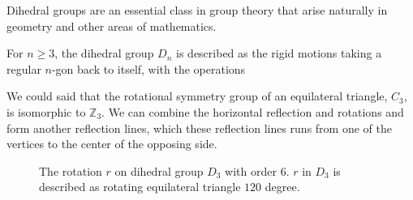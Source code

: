 Dihedral groups are an essential class in group theory that arise naturally in geometry and other areas of mathematics.

For $n \geq 3$, the dihedral group $D_n$ is described as the rigid motions taking a regular 
$n$-gon back to itself, with the operations 

We could said that the rotational symmetry group of an equilateral triangle, $C_3$, is isomorphic to
$\mathbb{Z}_3$. We can combine the horizontal reflection and rotations and form another reflection lines, 
which these reflection lines runs from one of the vertices to the center of the opposing side.

\begin{figure}[ht]
    \centering
\end{figure}
\begin{figure}[ht]
    \centering
\end{figure}
\begin{figure}[ht]
    \centering
    \caption{The rotation $r$ on dihedral group $D_3$ with order 6. $r$ in $D_3$ is described as rotating equilateral triangle $120$ degree.}
\end{figure}

